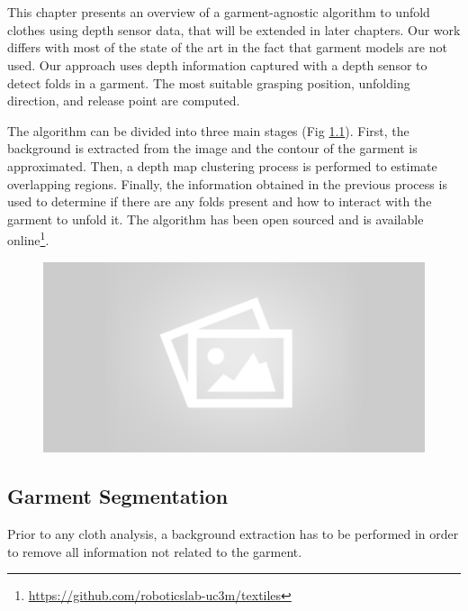 \chapter{\MyTitle}
\label{architecture}

This chapter presents an overview of a garment-agnostic algorithm to unfold clothes using depth sensor data, that will be extended in later chapters. Our work differs with most of the state of the art in the fact that garment models are not used. Our approach uses depth information captured with a depth sensor to detect folds in a garment. The most suitable grasping position, unfolding direction, and release point are computed.

The algorithm can be divided into three main stages (Fig \ref{fig:pipeline_block_diagram}). First, the  background is extracted from the image and the contour of the garment is approximated. Then, a depth map clustering process is performed to estimate overlapping regions. Finally, the information obtained in the previous process is used to determine if there are any folds present and how to interact with the garment to unfold it. The algorithm has been open sourced and is available online\footnote{\url{https://github.com/roboticslab-uc3m/textiles}}.

\begin{figure}[thpb]
    \centering
    \includegraphics[width=0.8
    \textwidth]{figures/placeholder2.png}
    \caption{}
    \label{fig:pipeline_block_diagram}
\end{figure}

\section{Garment Segmentation}
Prior to any cloth analysis, a background extraction has to be performed in order to remove all information not related to the garment. 


